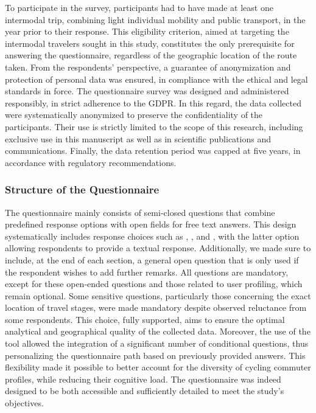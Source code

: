 \begin{refsegment}
To participate in the survey, participants had to have made at least one intermodal trip, combining light individual mobility and public transport, in the year prior to their response. This eligibility criterion, aimed at targeting the intermodal travelers sought in this study, constitutes the only prerequisite for answering the questionnaire, regardless of the geographic location of the route taken. From the respondents' perspective, a guarantee of anonymization and protection of personal data was ensured, in compliance with the ethical and legal standards in force. The questionnaire survey was designed and administered responsibly, in strict adherence to the \acrfull{GDPR}. In this regard, the data collected were systematically anonymized to preserve the confidentiality of the participants. Their use is strictly limited to the scope of this research, including exclusive use in this manuscript as well as in scientific publications and communications. Finally, the data retention period was capped at five years, in accordance with regulatory recommendations.%

\subsubsection*{Structure of the Questionnaire
    \label{chap3:administration-questionnaire-usagers-structure}
    }

The questionnaire mainly consists of semi-closed questions that combine predefined response options with open fields for free text answers. This design systematically includes response choices such as , , and , with the latter option allowing respondents to provide a textual response. Additionally, we made sure to include, at the end of each section, a general open question that is only used if the respondent wishes to add further remarks. All questions are mandatory, except for these open-ended questions and those related to user profiling, which remain optional. Some sensitive questions, particularly those concerning the exact location of travel stages, were made mandatory despite observed reluctance from some respondents. This choice, fully supported, aims to ensure the optimal analytical and geographical quality of the collected data. Moreover, the use of the  tool allowed the integration of a significant number of conditional questions, thus personalizing the questionnaire path based on previously provided answers. This flexibility made it possible to better account for the diversity of cycling commuter profiles, while reducing their cognitive load. The questionnaire was indeed designed to be both accessible and sufficiently detailed to meet the study’s objectives.%


\end{refsegment}
